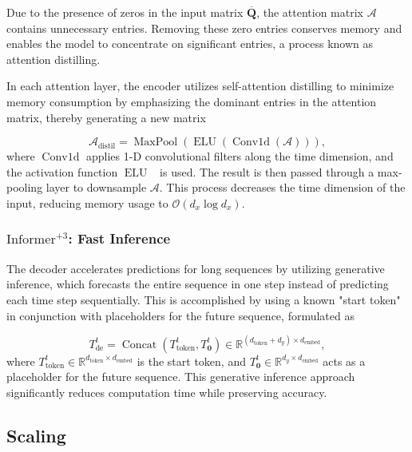 \documentclass{ieeetmlcn}
\begin{document}
Due to the presence of zeros in the input matrix $\overline{\mathbf{Q}}$, the attention matrix $\mathcal{A}$ contains unnecessary entries. Removing these zero entries conserves memory and enables the model to concentrate on significant entries, a process known as attention distilling.

In each attention layer, the encoder utilizes self-attention distilling to minimize memory consumption by emphasizing the dominant entries in the attention matrix, thereby generating a new matrix

\begin{equation}
\mathcal{A}_{\text{distil}} = \operatorname{MaxPool}\left(\operatorname{ELU}\left(\operatorname{Conv1d}\left(\mathcal{A}\right)\right)\right),
\end{equation}
where $\operatorname{Conv1d}$ applies 1-D convolutional filters along the time dimension, and the activation function $\operatorname{ELU}$~\cite{al2023fhic} is used. The result is then passed through a max-pooling layer to downsample $\mathcal{A}$. This process decreases the time dimension of the input, reducing memory usage to $\mathcal{O}(d_x \log d_x)$.

\subsubsection*{$\text{Informer}^{+3}$: Fast Inference}

The decoder accelerates predictions for long sequences by utilizing generative inference, which forecasts the entire sequence in one step instead of predicting each time step sequentially. This is accomplished by using a known "start token" in conjunction with placeholders for the future sequence, formulated as

\begin{equation}
T_{\mathrm{de}}^{t} = \operatorname{Concat}\left(T_{\text{token}}^{t}, T_{\mathbf{0}}^{t}\right) \in \mathbb{R}^{(d_{\text{token}} + d_y) \times d_{\text{embed}}},
\end{equation}
where $T_{\text{token}}^{t} \in \mathbb{R}^{d_{\text{token}} \times d_{\text{embed}}}$ is the start token, and $T_{\mathbf{0}}^{t} \in \mathbb{R}^{d_y \times d_{\text{embed}}}$ acts as a placeholder for the future sequence. This generative inference approach significantly reduces computation time while preserving accuracy.



\subsection{Scaling}
\end{document}
